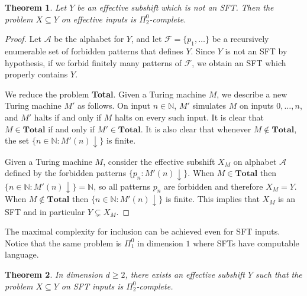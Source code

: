 \documentclass[a4paper]{article}
\newcommand{\N}{\mathbb{N}}
\newcommand{\A}{\mathcal{A}}
\newtheorem{theorem}{Theorem}[section]
\theoremstyle{definition}
\begin{document}
\begin{theorem}\label{inclusion-non-sft}
    Let $Y$ be an effective subshift which is not an SFT. Then the problem $X\subseteq Y$ on effective inputs is $\Pi_2^0$-complete.
\end{theorem}
\begin{proof}
    Let $\A$ be the alphabet for $Y$, and let $\mathcal F=\{p_1,\dots\}$ be a recursively enumerable set of forbidden patterns that defines $Y$. Since $Y$ is not an SFT by hypothesis, if we forbid finitely many patterns of $\mathcal F$, we obtain an SFT which properly contains $Y$. 

    We reduce the problem \textbf{Total}. Given a Turing machine $M$, we describe a new Turing machine  $M'$ as follows. On input $n\in\N$, $M'$ simulates $M$ on inputs $0,\dots,n$, and $M'$ halts if and only if $M$ halts on every such input. It is clear that $M\in \textbf{Total}$ if and only if $M'\in \textbf{Total}$. It is also clear that whenever $M\not\in\textbf{Total}$, the set $\{n\in\N : M'(n)\downarrow\}$ is finite. 

    Given a Turing machine $M$, consider the effective subshift $X_M$ on alphabet $\A$ defined by the forbidden patterns $\{p_n : M'(n)\downarrow\}$. When $M\in\textbf{Total}$ then $\{n\in\N : M'(n)\downarrow\}=\N$, so all patterns $p_n$ are forbidden and therefore $X_M=Y$. When $M\not\in\textbf{Total}$ then $\{n\in\N : M'(n)\downarrow\}$ is finite. This implies that $X_M$ is an SFT and in particular $Y\subsetneq X_M$. 
\end{proof}

The maximal complexity for inclusion can be achieved even for SFT inputs. Notice that the same problem is $\Pi^0_1$ in dimension $1$ where SFTs have computable language.

\begin{theorem}\label{thm:embed1}
In dimension $d\geq 2$, there exists an effective subshift $Y$ such that the problem $X\subseteq Y$ on SFT inputs is $\Pi^0_2$-complete.
\end{theorem}
\end{document}
